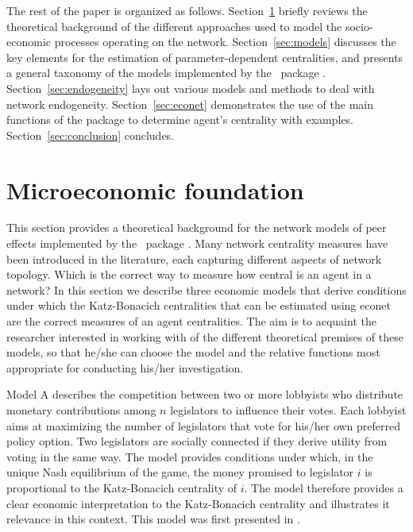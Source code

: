 \documentclass[nojss]{jss}
\begin{document}
The rest of the paper is organized as follows.  Section~\ref{sec:theory}
briefly reviews the theoretical background of the different approaches used
to model the socio-economic processes operating on the network. 
Section~\ref{sec:models} discusses the key elements for the estimation of
parameter-dependent centralities, and presents a general taxonomy of the
models implemented by the ~package . 
Section~\ref{sec:endogeneity} lays out various models and methods to deal
with network endogeneity.  Section~\ref{sec:econet} demonstrates the use of
the main functions of the package  to determine agent's
centrality with examples.  Section~\ref{sec:conclusion} concludes.

\section{Microeconomic foundation} \label{sec:theory}

This section provides a theoretical background for the network models of
peer effects implemented by the ~package .  Many
network centrality measures have been introduced in the literature, each
capturing different aspects of network topology.  Which is the correct way
to measure how central is an agent in a network?  In this section we
describe three economic models that derive conditions under which the
Katz-Bonacich centralities that can be estimated using econet are the
correct measures of an agent centralities.  The aim is to acquaint the
researcher interested in working with  of the different
theoretical premises of these models, so that he/she can choose the model
and the relative  functions most appropriate for conducting
his/her investigation.

Model A describes the competition between two or more lobbyists who
distribute monetary contributions among $n$ legislators to influence
their votes.  Each lobbyist aims at maximizing the number of legislators
that vote for his/her own preferred policy option.  Two legislators are
socially connected if they derive utility from voting in the same way.  The
model provides conditions under which, in the unique Nash equilibrium of the
game, the money promised to legislator $i$ is proportional to the
Katz-Bonacich centrality of $i$.  The model therefore provides a
clear economic interpretation to the Katz-Bonacich centrality and
illustrates it relevance in this context.  This model was first presented in
\cite{Battaglini+Patacchini:2018}.
\end{document}
